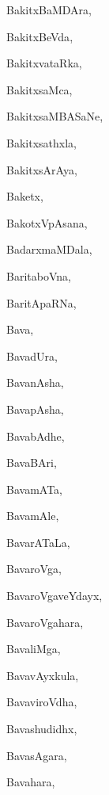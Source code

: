 \begin{multicols}{3}
{\noindent
{BakitxBaMDAra}, \pageref{BakitxBaMDAra}

\noindent
{BakitxBeVda}, \pageref{BakitxBeVda}

\noindent
{BakitxvataRka}, \pageref{BakitxvataRka}

\noindent
{BakitxsaMca}, \pageref{BakitxsaMca}

\noindent
{BakitxsaMBASaNe}, \pageref{BakitxsaMBASaNe}

\noindent
{Bakitxsathxla}, \pageref{Bakitxsathxla}

\noindent
{BakitxsArAya}, \pageref{BakitxsArAya}

\noindent
{Baketx}, \pageref{Baketx}

\noindent
{BakotxVpAsana}, \pageref{BakotxVpAsana}

\noindent
{BadarxmaMDala}, \pageref{BadarxmaMDala}

\noindent
{BaritaboVna}, \pageref{BaritaboVna}

\noindent
{BaritApaRNa}, \pageref{BaritApaRNa}

\noindent
{Bava}, \pageref{Bava}

\noindent
{BavadUra}, \pageref{BavadUra}

\noindent
{BavanAsha}, \pageref{BavanAsha}

\noindent
{BavapAsha}, \pageref{BavapAsha}

\noindent
{BavabAdhe}, \pageref{BavabAdhe}

\noindent
{BavaBAri}, \pageref{BavaBAri}

\noindent
{BavamATa}, \pageref{BavamATa}

\noindent
{BavamAle}, \pageref{BavamAle}

\noindent
{BavarATaLa}, \pageref{BavarATaLa}

\noindent
{BavaroVga}, \pageref{BavaroVga}

\noindent
{BavaroVgaveYdayx}, \pageref{BavaroVgaveYdayx}

\noindent
{BavaroVgahara}, \pageref{BavaroVgahara}

\noindent
{BavaliMga}, \pageref{BavaliMga}

\noindent
{BavavAyxkula}, \pageref{BavavAyxkula}

\noindent
{BavaviroVdha}, \pageref{BavaviroVdha}

\noindent
{Bavashudidhx}, \pageref{Bavashudidhx}

\noindent
{BavasAgara}, \pageref{BavasAgara}

\noindent
{Bavahara}, \pageref{Bavahara}

}
\end{multicols}
